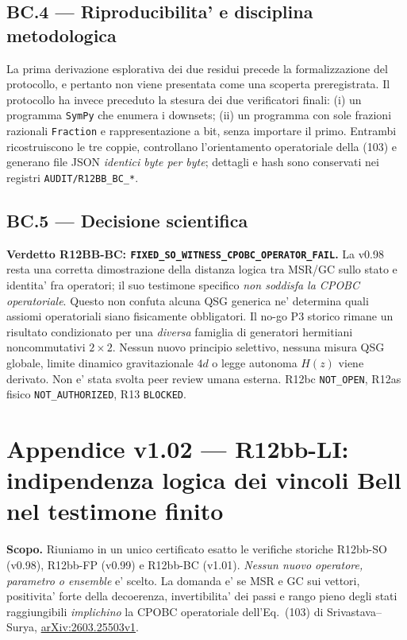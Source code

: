 \documentclass[11pt,a4paper]{article}
\begin{document}
\subsection*{BC.4 --- Riproducibilita' e disciplina metodologica}
La prima derivazione esplorativa dei due residui precede la formalizzazione del protocollo, e pertanto non viene presentata come una scoperta preregistrata. Il protocollo ha invece preceduto la stesura dei due verificatori finali: (i) un programma \texttt{SymPy} che enumera i downsets; (ii) un programma con sole frazioni razionali \texttt{Fraction} e rappresentazione a bit, senza importare il primo. Entrambi ricostruiscono le tre coppie, controllano l'orientamento operatoriale della (103) e generano file JSON \emph{identici byte per byte}; dettagli e hash sono conservati nei registri \texttt{AUDIT/R12BB\_BC\_*}.

\subsection*{BC.5 --- Decisione scientifica}
\textbf{Verdetto R12BB-BC: \texttt{FIXED\_SO\_WITNESS\_CPOBC\_OPERATOR\_FAIL}.}
La v0.98 resta una corretta dimostrazione della distanza logica tra MSR/GC sullo stato e identita' fra operatori; il suo testimone specifico \emph{non soddisfa la CPOBC operatoriale}. Questo non confuta alcuna QSG generica ne' determina quali assiomi operatoriali siano fisicamente obbligatori. Il no-go P3 storico rimane un risultato condizionato per una \emph{diversa} famiglia di generatori hermitiani noncommutativi $2\times2$. Nessun nuovo principio selettivo, nessuna misura QSG globale, limite dinamico gravitazionale $4d$ o legge autonoma $H(z)$ viene derivato. Non e' stata svolta peer review umana esterna. R12bc \texttt{NOT\_OPEN}, R12as fisico \texttt{NOT\_AUTHORIZED}, R13 \texttt{BLOCKED}.
\endgroup

\clearpage
\begingroup
\setlength{\parskip}{0.19em}
\section*{Appendice v1.02 --- R12bb-LI: indipendenza logica dei vincoli Bell nel testimone finito}
\textbf{Scopo.} Riuniamo in un unico certificato esatto le verifiche storiche R12bb-SO (v0.98), R12bb-FP (v0.99) e R12bb-BC (v1.01). \emph{Nessun nuovo operatore, parametro o ensemble} e' scelto. La domanda e' se MSR e GC sui vettori, positivita' forte della decoerenza, invertibilita' dei passi e rango pieno degli stati raggiungibili \emph{implichino} la CPOBC operatoriale dell'Eq.~(103) di Srivastava--Surya, \href{https://arxiv.org/pdf/2603.25503}{arXiv:2603.25503v1}.
\end{document}
